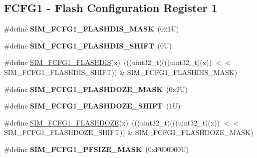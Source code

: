 \subsection*{F\+C\+F\+G1 -\/ Flash Configuration Register 1}
\begin{DoxyCompactItemize}
\item 
\mbox{\label{group___s_i_m___register___masks_gad2bcfe2db5329ab186bb8393228f24cc}} 
\#define {\bfseries S\+I\+M\+\_\+\+F\+C\+F\+G1\+\_\+\+F\+L\+A\+S\+H\+D\+I\+S\+\_\+\+M\+A\+SK}~(0x1\+U)
\item 
\mbox{\label{group___s_i_m___register___masks_ga1a8408a876a3a68b16780a1d45d539df}} 
\#define {\bfseries S\+I\+M\+\_\+\+F\+C\+F\+G1\+\_\+\+F\+L\+A\+S\+H\+D\+I\+S\+\_\+\+S\+H\+I\+FT}~(0\+U)
\item 
\#define \mbox{\hyperlink{group___s_i_m___register___masks_gaa783d3af583f1bcf4cd7805d8fcdf6e5}{S\+I\+M\+\_\+\+F\+C\+F\+G1\+\_\+\+F\+L\+A\+S\+H\+D\+IS}}(x)~(((uint32\+\_\+t)(((uint32\+\_\+t)(x)) $<$$<$ S\+I\+M\+\_\+\+F\+C\+F\+G1\+\_\+\+F\+L\+A\+S\+H\+D\+I\+S\+\_\+\+S\+H\+I\+FT)) \& S\+I\+M\+\_\+\+F\+C\+F\+G1\+\_\+\+F\+L\+A\+S\+H\+D\+I\+S\+\_\+\+M\+A\+SK)
\item 
\mbox{\label{group___s_i_m___register___masks_ga5922dc31ee4c05aba3cfeaa4474fddb8}} 
\#define {\bfseries S\+I\+M\+\_\+\+F\+C\+F\+G1\+\_\+\+F\+L\+A\+S\+H\+D\+O\+Z\+E\+\_\+\+M\+A\+SK}~(0x2\+U)
\item 
\mbox{\label{group___s_i_m___register___masks_ga3f6c60d4baf2c592dbd5c43974bd19f3}} 
\#define {\bfseries S\+I\+M\+\_\+\+F\+C\+F\+G1\+\_\+\+F\+L\+A\+S\+H\+D\+O\+Z\+E\+\_\+\+S\+H\+I\+FT}~(1\+U)
\item 
\#define \mbox{\hyperlink{group___s_i_m___register___masks_gaa8869a17756fb7c7746ce191f97073ec}{S\+I\+M\+\_\+\+F\+C\+F\+G1\+\_\+\+F\+L\+A\+S\+H\+D\+O\+ZE}}(x)~(((uint32\+\_\+t)(((uint32\+\_\+t)(x)) $<$$<$ S\+I\+M\+\_\+\+F\+C\+F\+G1\+\_\+\+F\+L\+A\+S\+H\+D\+O\+Z\+E\+\_\+\+S\+H\+I\+FT)) \& S\+I\+M\+\_\+\+F\+C\+F\+G1\+\_\+\+F\+L\+A\+S\+H\+D\+O\+Z\+E\+\_\+\+M\+A\+SK)
\item 
\mbox{\label{group___s_i_m___register___masks_ga5adf627ba4cd9516ebf3e0a6d33aa7c5}} 
\#define {\bfseries S\+I\+M\+\_\+\+F\+C\+F\+G1\+\_\+\+P\+F\+S\+I\+Z\+E\+\_\+\+M\+A\+SK}~(0x\+F000000\+U)

\end{DoxyCompactItemize}
